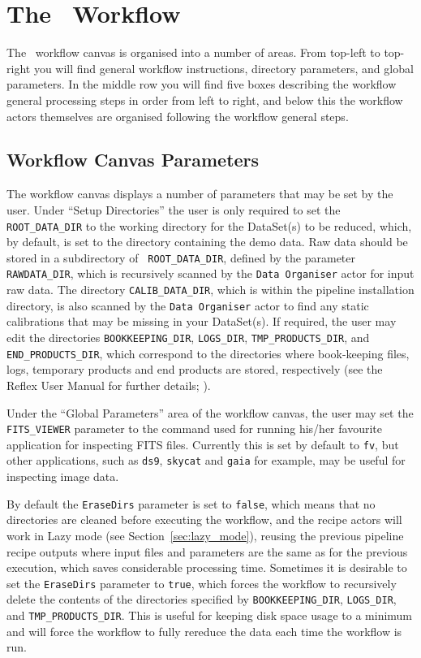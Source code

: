 \section{The \instname\, Workflow \label{sec:wkf_general_desc}}

The \instname\,  workflow canvas is organised into a number of areas.
From top-left to top-right you
will find general workflow instructions, directory parameters, and
global parameters.  In the middle row you will find five boxes
describing the workflow general processing steps in order from left to
right, and below this the workflow actors themselves are organised
following the workflow general steps. 

\subsection{Workflow Canvas Parameters \label{sec:wkf_canvpar}}

The workflow canvas displays a number of parameters that may be set by
the user. Under ``Setup
Directories'' the user is only required to set the {\tt
  ROOT\_DATA\_DIR} to the working directory for the DataSet(s) to be
reduced, which, by default, is set to the directory containing the
demo data. Raw data should be stored in a subdirectory of {\tt
  ROOT\_DATA\_DIR}, defined by the parameter {\tt RAWDATA\_DIR}, which
is recursively scanned by the {\tt Data Organiser} actor for input raw
data. The directory {\tt CALIB\_DATA\_DIR}, which is within the
pipeline installation directory, is also scanned by the {\tt Data
  Organiser} actor to find any static calibrations that may be missing
in your DataSet(s).  If required, the user may edit the directories
{\tt BOOKKEEPING\_DIR}, {\tt LOGS\_DIR}, {\tt TMP\_PRODUCTS\_DIR}, and
{\tt END\_PRODUCTS\_DIR}, which correspond to the directories where
book-keeping files, logs, temporary products and end products are
stored, respectively (see the Reflex User Manual for further details;
\cite{REFLEXMAN}).

Under the ``Global Parameters'' area of the workflow canvas, the user
may set the {\tt FITS\_VIEWER} parameter to the command used for
running his/her favourite application for inspecting FITS
files. Currently this is set by default to {\tt fv}, but other
applications, such as {\tt ds9}, {\tt skycat} and {\tt gaia} for
example, may be useful for inspecting image data.

By default the {\tt EraseDirs} parameter is set to {\tt false}, which
means that no directories are cleaned before executing the workflow,
and the recipe actors will work in Lazy mode (see
Section~\ref{sec:lazy_mode}), reusing the previous pipeline recipe outputs
where input files and parameters are the same as for the previous
execution, which saves considerable processing time. Sometimes it is
desirable to set the {\tt EraseDirs} parameter to {\tt true}, which
forces the workflow to recursively delete the contents of the
directories specified by {\tt BOOKKEEPING\_DIR}, {\tt LOGS\_DIR}, and
{\tt TMP\_PRODUCTS\_DIR}. This is useful for keeping disk space usage
to a minimum and will force the workflow to fully rereduce the data
each time the workflow is run.


